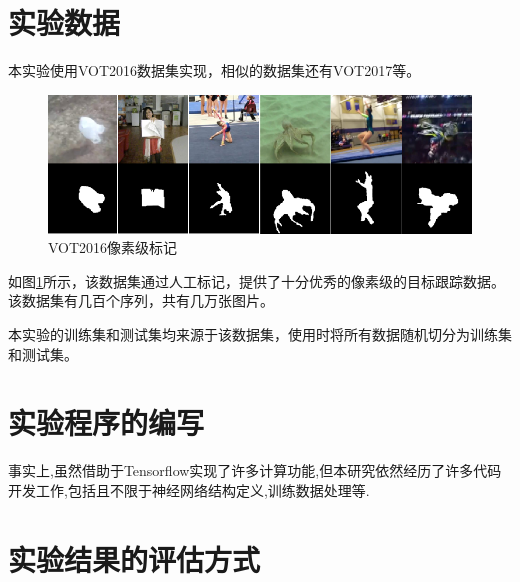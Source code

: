 \section{实验数据}
本实验使用VOT2016数据集\supercite{Vojir-TR-2017-01}实现，相似的数据集还有VOT2017等。
\par
\begin{figure}[htbp!]
    \centering
    \includegraphics[width = 1.\textwidth]{chap/img/vot_2016_pixel.png}
    \caption{VOT2016像素级标记}\label{fig:vot_2016_pixel}
\end{figure}
\par
如图\ref{fig:vot_2016_pixel}所示，该数据集通过人工标记，提供了十分优秀的像素级的目标跟踪数据。该数据集有几百个序列，共有几万张图片。
\par
本实验的训练集和测试集均来源于该数据集，使用时将所有数据随机切分为训练集和测试集。


\section{实验程序的编写}
事实上,虽然借助于Tensorflow实现了许多计算功能,但本研究依然经历了许多代码开发工作,包括且不限于神经网络结构定义,训练数据处理等.

\section{实验结果的评估方式}